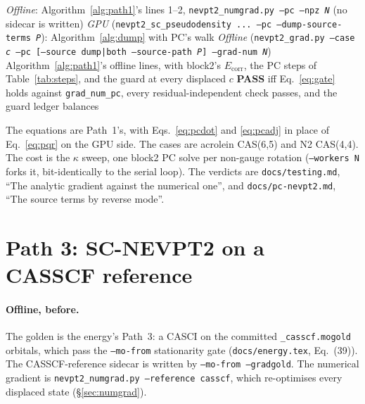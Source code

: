 \documentclass[11pt]{article}
\newcommand{\code}[1]{\texttt{#1}}
\newcommand{\Ecorr}{E_{\mathrm{corr}}}
\begin{document}
\begin{algorithm}[htbp]
\caption{Path 2, PC on CASCI orbitals}
\label{alg:path2}
\begin{algorithmic}[1]
\Statex \textit{Offline}: Algorithm~\ref{alg:path1}'s lines 1--2, \code{nevpt2\_numgrad.py --pc --npz \textit{N}} (no sidecar is written)
\Statex \textit{GPU} (\code{nevpt2\_sc\_pseudodensity ... --pc --dump-source-terms \textit{P}}): Algorithm~\ref{alg:dump} with PC's walk
\Statex \textit{Offline} (\code{nevpt2\_grad.py --case \textit{c} --pc [--source dump|both --source-path \textit{P}] --grad-num \textit{N}})
\State Algorithm~\ref{alg:path1}'s offline lines, with block2's $\Ecorr$, the PC steps of Table~\ref{tab:steps}, and the guard at every displaced $c$
\State \textbf{PASS} iff Eq.~\eqref{eq:gate} holds against \code{grad\_num\_pc}, every residual-independent check passes, and the guard ledger balances
\end{algorithmic}
\end{algorithm}

The equations are Path~1's, with Eqs.~\eqref{eq:pcdot} and \eqref{eq:pcadj}
in place of Eq.~\eqref{eq:pqr} on the GPU side. The cases are acrolein
CAS(6,5) and N2 CAS(4,4). The cost is the $\kappa$ sweep, one block2 PC solve
per non-gauge rotation (\code{--workers N} forks it, bit-identically to the
serial loop). The verdicts are \code{docs/testing.md}, ``The analytic gradient
against the numerical one'', and \code{docs/pc-nevpt2.md}, ``The source terms
by reverse mode''.

\section{Path 3: SC-NEVPT2 on a CASSCF reference}
\label{sec:sc-casscf}

\paragraph{Offline, before.} The golden is the energy's Path~3: a CASCI on the
committed \code{\_casscf.mogold} orbitals, which pass the \code{--mo-from}
stationarity gate (\code{docs/energy.tex}, Eq.~(39)). The CASSCF-reference
sidecar is written by \code{--mo-from --gradgold}. The numerical gradient is
\code{nevpt2\_numgrad.py --reference casscf}, which re-optimises every
displaced state (\S\ref{sec:numgrad}).
\end{document}
